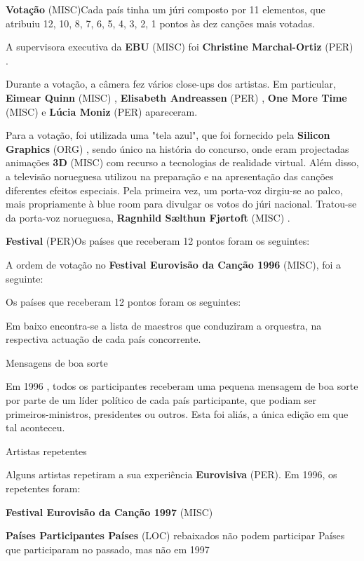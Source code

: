 \documentclass[12pt,a4paper]{article}
\begin{document}
\textbf{Votação} (MISC)Cada país tinha um júri composto por 11 elementos, que atribuiu 12, 10, 8, 7, 6, 5, 4, 3, 2, 1 pontos às dez canções mais votadas.

A supervisora executiva da \textbf{EBU} (MISC) foi \textbf{Christine Marchal-Ortiz} (PER) .

Durante a votação, a câmera fez vários close-ups dos artistas. Em particular, \textbf{Eimear Quinn} (MISC) , \textbf{Elisabeth Andreassen} (PER) , \textbf{One More Time} (MISC) e \textbf{Lúcia Moniz} (PER) apareceram.

Para a votação, foi utilizada uma "tela azul", que foi fornecido pela \textbf{Silicon Graphics} (ORG) , sendo único na história do concurso, onde eram projectadas animações \textbf{3D} (MISC) com recurso a tecnologias de realidade virtual. Além disso, a televisão norueguesa utilizou na preparação e na apresentação das canções diferentes efeitos especiais. Pela primeira vez, um porta-voz dirgiu-se ao palco, mais propriamente à blue room para divulgar os votos do júri nacional. Tratou-se da porta-voz norueguesa, \textbf{Ragnhild Sælthun Fjørtoft} (MISC) .



\textbf{Festival} (PER)Os países que receberam 12 pontos foram os seguintes:

A ordem de votação no \textbf{Festival Eurovisão da Canção 1996} (MISC), foi a seguinte:

Os países que receberam 12 pontos foram os seguintes:

Em baixo encontra-se a lista de maestros que conduziram a orquestra, na respectiva actuação de cada país concorrente.



Mensagens de boa sorte

Em 1996 , todos os participantes receberam uma pequena mensagem de boa sorte por parte de um líder político de cada país participante, que podiam ser primeiros-ministros, presidentes ou outros. Esta foi aliás, a única edição em que tal aconteceu.



Artistas repetentes

Alguns artistas repetiram a sua experiência \textbf{Eurovisiva} (PER). Em 1996, os repetentes foram:



\textbf{Festival Eurovisão da Canção 1997} (MISC)



\textbf{Países Participantes Países} (LOC) rebaixados não podem participar Países que participaram no passado, mas não em 1997
\end{document}
